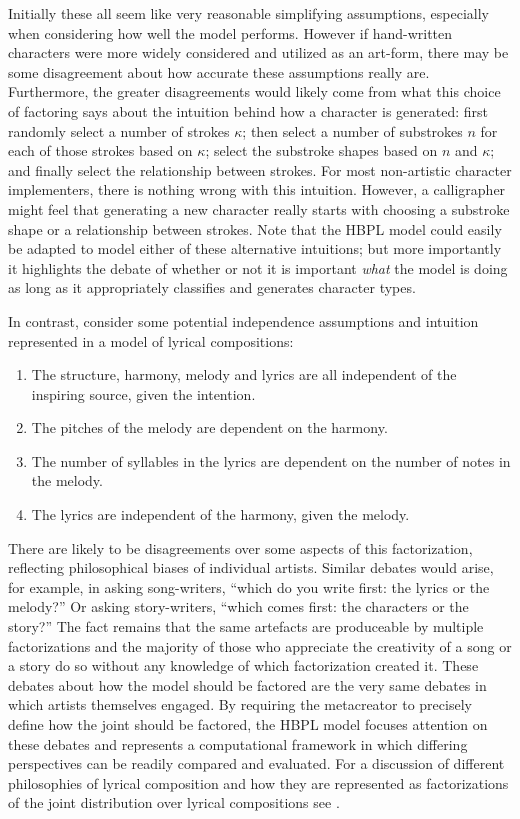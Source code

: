 \documentclass[letterpaper]{article}
\begin{document}
\noindent Initially these all seem like very reasonable simplifying assumptions, especially when considering how well the model performs. However if hand-written characters were more widely considered and utilized as an art-form, there may be some disagreement about how accurate these assumptions really are. Furthermore, the greater disagreements would likely come from what this choice of factoring says about the intuition behind how a character is generated: first randomly select a number of strokes $\kappa$; then select a number of substrokes $n$ for each of those strokes based on $\kappa$; select the substroke shapes based on $n$ and $\kappa$; and finally select the relationship between strokes. For most non-artistic character implementers, there is nothing wrong with this intuition. However, a calligrapher might feel that generating a new character really starts with choosing a substroke shape or a relationship between strokes. Note that the HBPL model could easily be adapted to model either of these alternative intuitions; but more importantly it highlights the debate of whether or not it is important \emph{what} the model is doing as long as it appropriately classifies and generates character types.

In contrast, consider some potential independence assumptions and intuition represented in a model of lyrical compositions:

\begin{enumerate}  
\item The structure, harmony, melody and lyrics are all independent of the inspiring source, given the intention.
\item The pitches of the melody are dependent on the harmony.
\item The number of syllables in the lyrics are dependent on the number of notes in the melody.
\item The lyrics are independent of the harmony, given the melody.
\end{enumerate}

There are likely to be disagreements over some aspects of this factorization, reflecting philosophical biases of individual artists. Similar debates would arise, for example, in asking song-writers, ``which do you write first: the lyrics or the melody?'' Or asking story-writers, ``which comes first: the characters or the story?'' The fact remains that the same artefacts are produceable by multiple factorizations and the majority of those who appreciate the creativity of a song or a story do so without any knowledge of which factorization created it. These debates about how the model should be factored are the very same debates in which artists themselves engaged. By requiring the metacreator to precisely define how the joint should be factored, the HBPL model focuses attention on these debates and represents a computational framework in which differing perspectives can be readily compared and evaluated. For a discussion of different philosophies of lyrical composition and how they are represented as factorizations of the joint distribution over lyrical compositions see \citeauthor{bodily2017Mume} .
\end{document}

